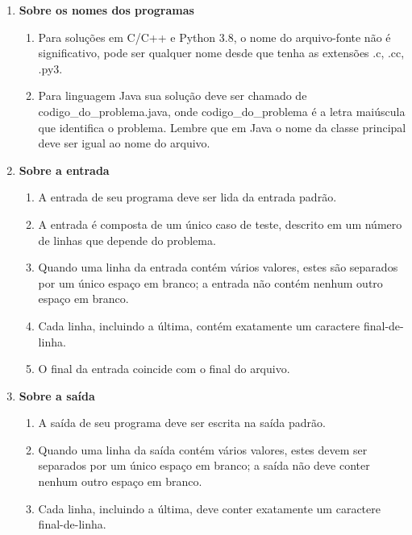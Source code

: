 \begin{enumerate}
    \item \textbf{Sobre os nomes dos programas}
    \begin{enumerate}
        \item Para soluções em C/C++ e Python 3.8, o nome do arquivo-fonte não é significativo, pode ser qualquer nome desde que tenha as extensões .c, .cc, .py3.
        \item Para linguagem Java sua solução deve ser chamado de codigo\_do\_problema.java, onde codigo\_do\_problema é a letra maiúscula que identifica o problema. Lembre que em Java o nome da classe principal deve ser igual ao nome do arquivo.
    \end{enumerate}
    \item \textbf{Sobre a entrada}
    \begin{enumerate}
        \item A entrada de seu programa deve ser lida da entrada padrão.
        \item A entrada é composta de um único caso de teste, descrito em um número de linhas que depende do problema.
        \item Quando uma linha da entrada contém vários valores, estes são separados por um único espaço em branco; a entrada não contém nenhum outro espaço em branco.
        \item Cada linha, incluindo a última, contém exatamente um caractere final-de-linha.
        \item O final da entrada coincide com o final do arquivo.
    \end{enumerate}
    \item \textbf{Sobre a saída}
    \begin{enumerate}
        \item A saída de seu programa deve ser escrita na saída padrão.
        \item Quando uma linha da saída contém vários valores, estes devem ser separados por um único espaço em branco; a saída não deve conter nenhum outro espaço em branco.
        \item Cada linha, incluindo a última, deve conter exatamente um caractere final-de-linha.
    \end{enumerate}
\end{enumerate}

\newpage

%

\newpage

